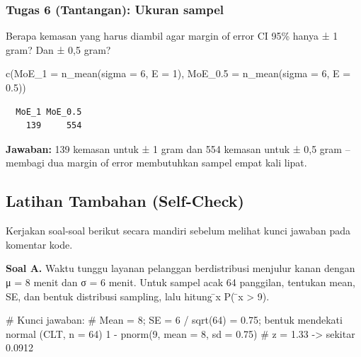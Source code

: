 \documentclass[
  indonesian,
  letterpaper,
]{book}
\newenvironment{Shaded}{\begin{snugshade}}{\end{snugshade}}
\newcommand{\AttributeTok}[1]{\textcolor[rgb]{0.40,0.45,0.13}{#1}}
\newcommand{\CommentTok}[1]{\textcolor[rgb]{0.37,0.37,0.37}{#1}}
\newcommand{\DecValTok}[1]{\textcolor[rgb]{0.68,0.00,0.00}{#1}}
\newcommand{\FloatTok}[1]{\textcolor[rgb]{0.68,0.00,0.00}{#1}}
\newcommand{\FunctionTok}[1]{\textcolor[rgb]{0.28,0.35,0.67}{#1}}
\newcommand{\NormalTok}[1]{\textcolor[rgb]{0.00,0.23,0.31}{#1}}
\newcommand{\SpecialCharTok}[1]{\textcolor[rgb]{0.37,0.37,0.37}{#1}}
\begin{document}
\subsubsection{Tugas 6 (Tantangan): Ukuran
sampel}\label{tugas-6-tantangan-ukuran-sampel}

Berapa kemasan yang harus diambil agar margin of error CI 95\% hanya ± 1
gram? Dan ± 0,5 gram?

\begin{Shaded}
\begin{Highlighting}[]
\FunctionTok{c}\NormalTok{(}\AttributeTok{MoE\_1 =} \FunctionTok{n\_mean}\NormalTok{(}\AttributeTok{sigma =} \DecValTok{6}\NormalTok{, }\AttributeTok{E =} \DecValTok{1}\NormalTok{), }\AttributeTok{MoE\_0.5 =} \FunctionTok{n\_mean}\NormalTok{(}\AttributeTok{sigma =} \DecValTok{6}\NormalTok{, }\AttributeTok{E =} \FloatTok{0.5}\NormalTok{))}
\end{Highlighting}
\end{Shaded}

\begin{verbatim}
  MoE_1 MoE_0.5 
    139     554 
\end{verbatim}

\textbf{Jawaban:} 139 kemasan untuk ± 1 gram dan 554 kemasan untuk ± 0,5
gram -- membagi dua margin of error membutuhkan sampel empat kali lipat.

\subsection{Latihan Tambahan
(Self-Check)}\label{latihan-tambahan-self-check}

Kerjakan soal-soal berikut secara mandiri sebelum melihat kunci jawaban
pada komentar kode.

\textbf{Soal A.} Waktu tunggu layanan pelanggan berdistribusi menjulur
kanan dengan μ = 8 menit dan σ = 6 menit. Untuk sampel acak 64
panggilan, tentukan mean, SE, dan bentuk distribusi sampling, lalu
hitung ̄x P( ̄x \textgreater{} 9).

\begin{Shaded}
\begin{Highlighting}[]
\CommentTok{\# Kunci jawaban:}
\CommentTok{\# Mean = 8; SE = 6 / sqrt(64) = 0.75; bentuk mendekati normal (CLT, n = 64)}
\DecValTok{1} \SpecialCharTok{{-}} \FunctionTok{pnorm}\NormalTok{(}\DecValTok{9}\NormalTok{, }\AttributeTok{mean =} \DecValTok{8}\NormalTok{, }\AttributeTok{sd =} \FloatTok{0.75}\NormalTok{) }\CommentTok{\# z = 1.33 {-}\textgreater{} sekitar 0.0912}
\end{Highlighting}
\end{Shaded}
\end{document}
